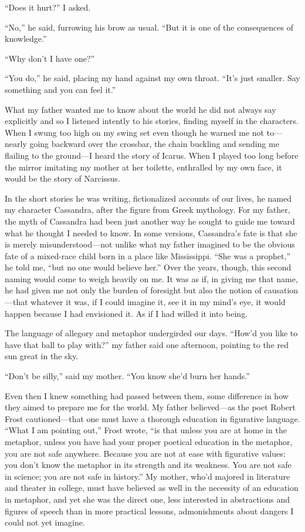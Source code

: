 ``Does it hurt?'' I asked.

``No,'' he said, furrowing his brow as usual. ``But it is one of the
consequences of knowledge.''

``Why don't I have one?''

``You do,'' he said, placing my hand against my own throat. ``It's just
smaller. Say something and you can feel it.''

What my father wanted me to know about the world he did not always say
explicitly and so I listened intently to his stories, finding myself in
the characters. When I swung too high on my swing set even though he
warned me not to---nearly going backward over the crossbar, the chain
buckling and sending me flailing to the ground---I heard the story of
Icarus. When I played too long before the mirror imitating my mother at
her toilette, enthralled by my own face, it would be the story of
Narcissus.

In the short stories he was writing, fictionalized accounts of our
lives, he named my character Cassandra, after the figure from Greek
mythology. For my father, the myth of Cassandra had been just another
way he sought to guide me toward what he thought I needed to know. In
some versions, Cassandra's fate is that she is merely
misunderstood---not unlike what my father imagined to be the obvious
fate of a mixed-race child born in a place like Mississippi. ``She was a
prophet,'' he told me, ``but no one would believe her.'' Over the years,
though, this second naming would come to weigh heavily on me. It was as
if, in giving me that name, he had given me not only the burden of
foresight but also the notion of causation---that whatever it was, if I
could imagine it, see it in my mind's eye, it would happen because I had
envisioned it. As if I had willed it into being.

The language of allegory and metaphor undergirded our days. ``How'd you
like to have that ball to play with?'' my father said one afternoon,
pointing to the red sun great in the sky.

``Don't be silly,'' said my mother. ``You know she'd burn her hands.''

Even then I knew something had passed between them, some difference in
how they aimed to prepare me for the world. My father believed---as the
poet Robert Frost cautioned---that one must have a thorough education in
figurative language. ``What I am pointing out,'' Frost wrote, ``is that
unless you are at home in the metaphor, unless you have had your proper
poetical education in the metaphor, you are not safe anywhere. Because
you are not at ease with figurative values: you don't know the metaphor
in its strength and its weakness. You are not safe in science; you are
not safe in history.'' My mother, who'd majored in literature and
theater in college, must have believed as well in the necessity of an
education in metaphor, and yet she was the direct one, less interested
in abstractions and figures of speech than in more practical lessons,
admonishments about dangers I could not yet imagine.

